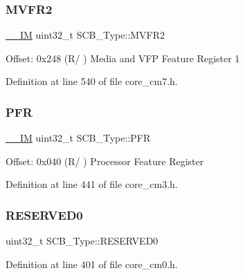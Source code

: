 \subsubsection{\texorpdfstring{M\+V\+F\+R2}{MVFR2}}
{\footnotesize\ttfamily \hyperlink{core__sc300_8h_a4cc1649793116d7c2d8afce7a4ffce43}{\+\_\+\+\_\+\+IM} uint32\+\_\+t S\+C\+B\+\_\+\+Type\+::\+M\+V\+F\+R2}

Offset\+: 0x248 (R/ ) Media and V\+FP Feature Register 1 

Definition at line 540 of file core\+\_\+cm7.\+h.

\mbox{\label{struct_s_c_b___type_a40745bb0af880c45827a653222d54117}} 
\subsubsection{\texorpdfstring{P\+FR}{PFR}}
{\footnotesize\ttfamily \hyperlink{core__sc300_8h_a4cc1649793116d7c2d8afce7a4ffce43}{\+\_\+\+\_\+\+IM} uint32\+\_\+t S\+C\+B\+\_\+\+Type\+::\+P\+FR}

Offset\+: 0x040 (R/ ) Processor Feature Register 

Definition at line 441 of file core\+\_\+cm3.\+h.

\mbox{\label{struct_s_c_b___type_a10960cdc703f661c83a237d9c69db23c}} 
\subsubsection{\texorpdfstring{R\+E\+S\+E\+R\+V\+E\+D0}{RESERVED0}}
{\footnotesize\ttfamily uint32\+\_\+t S\+C\+B\+\_\+\+Type\+::\+R\+E\+S\+E\+R\+V\+E\+D0}



Definition at line 401 of file core\+\_\+cm0.\+h.

\mbox{\label{struct_s_c_b___type_adddd65958c1c4c0301f62ede0a9bf12e}} 
